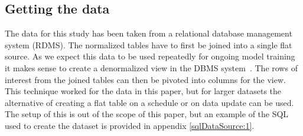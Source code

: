 \documentclass[runningheads]{llncs}
\begin{document}
\subsection{Getting the data}
The data for this study has been taken from a relational database management system (RDMS). The normalized tables have to first be joined into a single flat source. As we expect this data to be used repeatedly for ongoing model training it makes sense to create a denormalized view in the DBMS system~\cite{ref_url1}. The rows of interest from the joined tables can then be pivoted into columns for the view. This technique worked for the data in this paper, but for larger datasets the alternative of creating a flat table on a schedule or on data update can be used. The setup of this is out of the scope of this paper, but an example of the SQL used to create the dataset is provided in appendix \ref{sqlDataSource:1}. 
\end{document}
